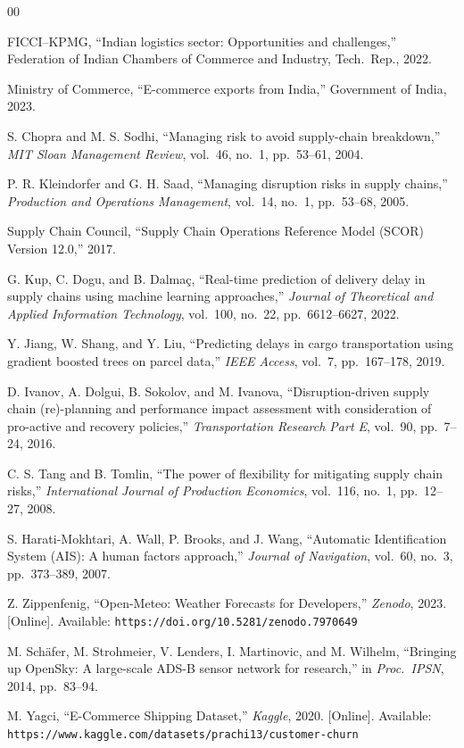 \documentclass[conference]{IEEEtran}
\begin{document}
\begin{thebibliography}{00}

FICCI--KPMG, ``Indian logistics sector: Opportunities and challenges,''
Federation of Indian Chambers of Commerce and Industry, Tech.\ Rep., 2022.

Ministry of Commerce, ``E-commerce exports from India,''
Government of India, 2023.

S. Chopra and M. S. Sodhi, ``Managing risk to avoid supply-chain
breakdown,'' \textit{MIT Sloan Management Review}, vol.~46, no.~1,
pp.~53--61, 2004.

P. R. Kleindorfer and G. H. Saad, ``Managing disruption risks in
supply chains,'' \textit{Production and Operations Management},
vol.~14, no.~1, pp.~53--68, 2005.

Supply Chain Council, ``Supply Chain Operations Reference Model
(SCOR) Version 12.0,'' 2017.

G. Kup, C. Dogu, and B. Dalmaç, ``Real-time prediction of delivery
delay in supply chains using machine learning approaches,''
\textit{Journal of Theoretical and Applied Information Technology},
vol.~100, no.~22, pp.~6612--6627, 2022.

Y. Jiang, W. Shang, and Y. Liu, ``Predicting delays in cargo
transportation using gradient boosted trees on parcel data,''
\textit{IEEE Access}, vol.~7, pp.~167--178, 2019.

D. Ivanov, A. Dolgui, B. Sokolov, and M. Ivanova, ``Disruption-driven
supply chain (re)-planning and performance impact assessment with
consideration of pro-active and recovery policies,''
\textit{Transportation Research Part E}, vol.~90, pp.~7--24, 2016.

C. S. Tang and B. Tomlin, ``The power of flexibility for mitigating
supply chain risks,'' \textit{International Journal of Production
Economics}, vol.~116, no.~1, pp.~12--27, 2008.

S. Harati-Mokhtari, A. Wall, P. Brooks, and J. Wang,
``Automatic Identification System (AIS): A human factors approach,''
\textit{Journal of Navigation}, vol.~60, no.~3, pp.~373--389, 2007.

Z. Zippenfenig, ``Open-Meteo: Weather Forecasts for Developers,''
\textit{Zenodo}, 2023. [Online]. Available:
\texttt{https://doi.org/10.5281/zenodo.7970649}

M. Schäfer, M. Strohmeier, V. Lenders, I. Martinovic, and M. Wilhelm,
``Bringing up OpenSky: A large-scale ADS-B sensor network for
research,'' in \textit{Proc.\ IPSN}, 2014, pp.~83--94.

M. Yagci, ``E-Commerce Shipping Dataset,''
\textit{Kaggle}, 2020. [Online]. Available:
\texttt{https://www.kaggle.com/datasets/prachi13/customer-churn}

\end{thebibliography}
\end{document}
